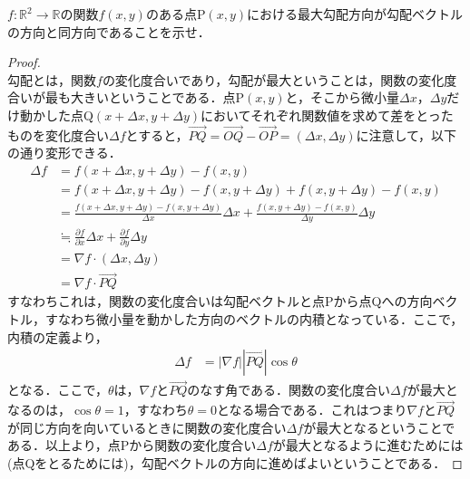 \begin{qu}
$f:\mathbb{R}^2 \to \mathbb{R}$の関数$f(x,y)$のある点P$(x,y)$における最大勾配方向が勾配ベクトルの方向と同方向であることを示せ．
\end{qu}
\begin{proof}
　\\
勾配とは，関数$f$の変化度合いであり，勾配が最大ということは，関数の変化度合いが最も大きいということである．点P$(x,y)$と，そこから微小量$\Delta x$，$\Delta y$だけ動かした点Q$(x+\Delta x,y+\Delta y)$においてそれぞれ関数値を求めて差をとったものを変化度合い$\Delta f$とすると，$\overrightarrow{PQ}=\overrightarrow{OQ}-\overrightarrow{OP}=(\Delta x,\Delta y)$に注意して，以下の通り変形できる．
\begin{align*}
\Delta f &= f(x+\Delta x,y+\Delta y)-f(x,y) \\
&= f(x+\Delta x,y+\Delta y) -f(x,y+\Delta y)+f(x,y+\Delta y) -f(x,y) \\
&= \frac{f(x+\Delta x,y+\Delta y) -f(x,y+\Delta y)}{\Delta x}\Delta x +\frac{f(x,y+\Delta y) -f(x,y)}{\Delta y}\Delta y \\
&\fallingdotseq \frac{\partial f}{\partial x}\Delta x +\frac{\partial f}{\partial y}\Delta y \\
&= \nabla f \cdot (\Delta x,\Delta y) \\
&= \nabla f \cdot \overrightarrow{PQ}
\end{align*}
すなわちこれは，関数の変化度合いは勾配ベクトルと点Pから点Qへの方向ベクトル，すなわち微小量を動かした方向のベクトルの内積となっている．ここで，内積の定義より，
\begin{align*}
\Delta f &= |\nabla f||\overrightarrow{PQ}|\cos \theta
\end{align*}
となる．ここで，$\theta$は，$\nabla f$と$\overrightarrow{PQ}$のなす角である．関数の変化度合い$\Delta f$が最大となるのは，$\cos \theta =1$，すなわち$\theta =0$となる場合である．これはつまり$\nabla f$と$\overrightarrow{PQ}$が同じ方向を向いているときに関数の変化度合い$\Delta f$が最大となるということである．以上より，点Pから関数の変化度合い$\Delta f$が最大となるように進むためには(点Qをとるためには)，勾配ベクトルの方向に進めばよいということである．
\end{proof}

